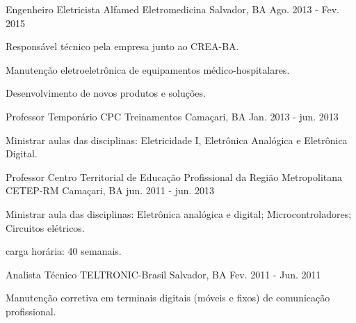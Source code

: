\begin{cventries}
  \cventry
    {Engenheiro Eletricista} %
    {Alfamed Eletromedicina} %
    {Salvador, BA} %
    {Ago. 2013 - Fev. 2015} %
    {
      \begin{cvitems} %
        \item {Responsável técnico pela empresa junto ao CREA-BA.}
        \item {Manutenção eletroeletrônica de equipamentos médico-hospitalares.}
        \item {Desenvolvimento de novos produtos e soluções.}
      \end{cvitems}
    }
    
  \cventry
    {Professor Temporário} %
    {CPC Treinamentos} %
    {Camaçari, BA} %
    {Jan. 2013 - jun. 2013} %
    {
      \begin{cvitems} %
        \item {Ministrar aulas das disciplinas: Eletricidade I, Eletrônica Analógica  e Eletrônica Digital.}
      \end{cvitems}
    }

  \cventry
    {Professor} %
    {Centro Territorial de Educação Profissional da Região Metropolitana CETEP-RM} %
    {Camaçari, BA} %
    {jun. 2011 - jun. 2013} %
    {
      \begin{cvitems} %
        \item {Ministrar aula das disciplinas: Eletrônica analógica e digital; Microcontroladores; Circuitos elétricos.}
        \item {carga horária: 40 semanais.}
      \end{cvitems}
    }
    
  \cventry
    {Analista Técnico} %
    {TELTRONIC-Brasil} %
    {Salvador, BA} %
    {Fev. 2011 - Jun. 2011} %
    {
      \begin{cvitems} %
        \item {Manutenção corretiva em terminais digitais (móveis e fixos) de comunicação profissional.}
      \end{cvitems}
    }
    

\end{cventries}
